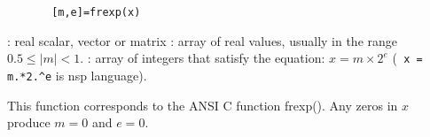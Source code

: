 

\begin{mandesc}
\end{mandesc}


\begin{calling_sequence}
    \begin{verbatim}
       [m,e]=frexp(x)  
    \end{verbatim}
\end{calling_sequence}


\begin{parameters}
  \begin{varlist}
   : real scalar, vector or matrix
   : array of real values, usually in the range $0.5 \le |m| < 1$.
   : array of integers that satisfy the equation: $x = m
   \times 2^e$ (\verb+ x = m.*2.^e+ is nsp language).
  \end{varlist}
\end{parameters}

\begin{mandescription}
    This function corresponds to the ANSI C function frexp().
  Any zeros in $x$ produce $m=0$ and $e=0$.
\end{mandescription}


\begin{examples}

\begin{program}
\end{program}

\end{examples}


\begin{manseealso}
\end{manseealso}

